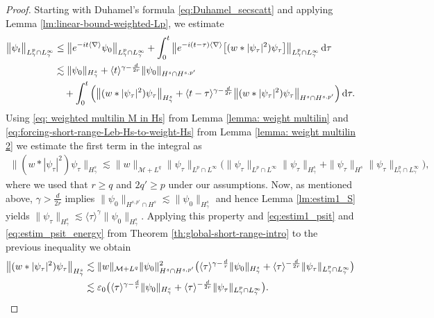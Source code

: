 \documentclass[12pt]{article}
\theoremstyle{plain}
\newcommand{\meas}{\mathcal{M}}
\begin{document}
\begin{proof}
Starting with Duhamel's formula \eqref{eq:Duhamel_secscatt} and applying Lemma \ref{lm:linear-bound-weighted-Lp}, we estimate
\begin{align}
\big\|\psi_t\big\|_{L^{p}_\gamma\cap L^\infty_\gamma}&\le\big\| e^{-it\langle\nabla\rangle}\psi_0\big\|_{L^{p}_\gamma\cap L^\infty_\gamma}+ \int_0^t \big\| e^{-i(t-\tau)\langle\nabla\rangle} \big[(w * |\psi_\tau|^2)\psi_\tau\big]\big\|_{L^{p}_\gamma\cap L^\infty_\gamma}\, \mathrm{d}\tau\notag \\
&\lesssim \|\psi_0\|_{H^s_\gamma}+\langle t\rangle ^{\gamma-\frac{d}{2r}}\|\psi_0\|_{H^s\cap H^{s,p'}}\notag\\
&\quad+ \int_0^t \Big(\big\|(w * |\psi_\tau|^2)\psi_\tau\big\|_{H^s_\gamma} +\langle t-\tau\rangle^{\gamma-\frac{d}{2r}}\big\| (w * |\psi_\tau|^2)\psi_\tau\big\|_{H^s\cap H^{s,p'}}\Big)\, \mathrm{d}\tau .\label{eq:estim1-weigted-Lp}
\end{align}
Using \eqref{eq: weighted multilin M in Hs} from Lemma \ref{lemma: weight multilin} and \eqref{eq:forcing-short-range-Leb-Hs-to-weight-Hs} from Lemma \ref{lemma: weight multilin 2} we estimate the first term in the integral as
\begin{align*}
\big\|(w * |\psi_\tau|^2)\psi_\tau\big\|_{H^s_\gamma}\lesssim \|w\|_{\meas+L^{q}} \|\psi_\tau\|_{L^p\cap L^\infty}\big( \|\psi_\tau\|_{L^p\cap L^\infty} \|\psi_\tau\|_{H^s_\gamma}+\|\psi_\tau\|_{H^s}\|\psi_\tau\|_{L^p_\gamma\cap L^\infty_\gamma}\big) ,
\end{align*}
where we used that $r\ge q$ and $2q'\ge p$ under our assumptions. Now, as mentioned above, $\gamma>\frac{d}{2r}$ implies $\|\psi_0\|_{H^{s,p'}\cap H^s}\lesssim \|\psi_0\|_{H^s_\gamma}$ and hence Lemma \ref{lm:estim1_S} yields $ \|\psi_\tau\|_{H^s_\gamma} \lesssim \langle \tau \rangle^\gamma \|\psi_0\|_{H^s_\gamma}$. Applying this property and \eqref{eq:estim1_psit} and \eqref{eq:estim_psit_energy} from Theorem \ref{th:global-short-range-intro} to the previous inequality we obtain 
\begin{align}
   \big\|(w * |\psi_\tau|^2)\psi_\tau\big\|_{H^s_\gamma} &\lesssim  \|w\|_{\meas+L^{q}}\|\psi_0\|^2_{H^s\cap H^{s,p'}}\big(\langle \tau\rangle^{\gamma-\frac{d}{r}} \|\psi_0\|_{H^s_\gamma}+\langle\tau\rangle^{-\frac{d}{2r}}\|\psi_\tau\|_{L^p_\gamma\cap L^\infty_\gamma}\big)\notag\\
  &\lesssim \varepsilon_0\big(\langle \tau\rangle^{\gamma-\frac{d}{r}} \|\psi_0\|_{H^s_\gamma}+\langle\tau\rangle^{-\frac{d}{2r}}\|\psi_\tau\|_{L^p_\gamma\cap L^\infty_\gamma}\big) \label{eq:bound G gamma,s-G gamma,s}.
\end{align}



\end{proof}
\end{document}

